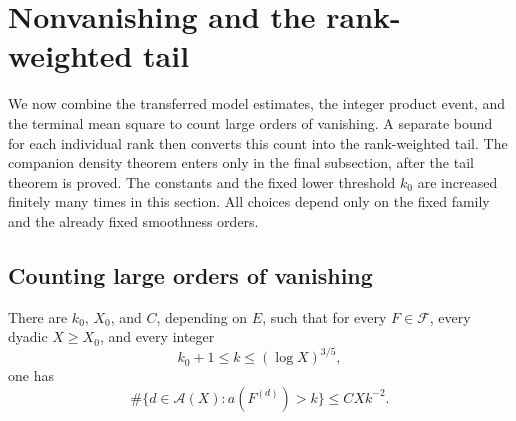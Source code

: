 \section{Nonvanishing and the rank-weighted tail}\label{sec:tail}

We now combine the transferred model estimates, the integer product
event, and the terminal mean square to count large orders of vanishing.
A separate bound for each individual rank then converts this count into
the rank-weighted tail. The companion density theorem enters only in
the final subsection, after the tail theorem is proved.
The constants and the fixed
lower threshold \(k_0\) are increased finitely many times in this section.
All choices depend only on the fixed family and the already fixed
smoothness orders.

\subsection{Counting large orders of vanishing}

\begin{proposition}\label{tail:count}
There are \(k_0\), \(X_0\), and \(C\), depending on \(E\), such that for
every \(F\in\mathcal F\), every dyadic \(X\ge X_0\), and every integer
\[
 k_0+1\le k\le(\log X)^{3/5},
\]
one has
\[
 \#\{d\in\mathcal A(X):a(F^{(d)})>k\}\le C Xk^{-2}.
\]
\end{proposition}

